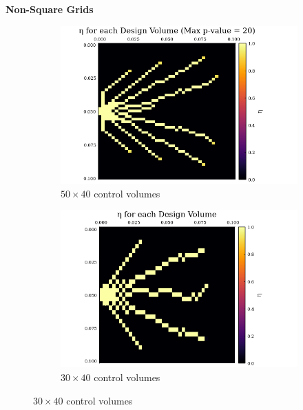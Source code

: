 \documentclass[final]{beamer}
\begin{document}
\begin{frame}{\textbf{Non-Square Grids}}
	\begin{figure}
		\begin{subfigure}{0.45\textwidth}
			\centering
			\includegraphics[width=1.1\linewidth]{50x40-Final_Design.png}
			\caption[Rectangular Control Volume Design]{$50\times 40$ control volumes}\label{fig:SIMP-Output-50-40}
		\end{subfigure}
		\begin{subfigure}{0.45\textwidth}
			\centering
			\includegraphics[width=1.1\textwidth]{SIMP-Example-Checkerboarding.png}
			\caption[Checkerboard Result in Practice]{$30\times 40$ control volumes}
			\label{fig:SIMP-Checkerboard}
		\end{subfigure}
	\end{figure}
\end{frame}
\end{document}
